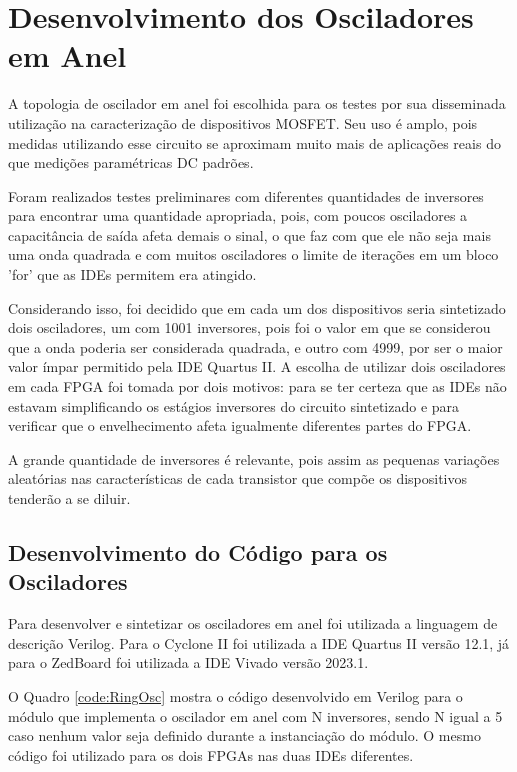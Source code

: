 \section{Desenvolvimento dos Osciladores em Anel}
\label{sec:MetOscilador}

A topologia de oscilador em anel foi escolhida para os testes por sua disseminada utilização na caracterização de dispositivos MOSFET. Seu uso é amplo, pois medidas utilizando esse circuito se aproximam muito mais de aplicações reais do que medições paramétricas DC padrões.

Foram realizados testes preliminares com diferentes quantidades de inversores para encontrar uma quantidade apropriada, pois, com poucos osciladores a capacitância de saída afeta demais o sinal, o que faz com que ele não seja mais uma onda quadrada e com muitos osciladores o limite de iterações em um bloco 'for' que as IDEs permitem era atingido.

Considerando isso, foi decidido que em cada um dos dispositivos seria sintetizado dois osciladores, um com 1001 inversores, pois foi o valor em que se considerou que a onda poderia ser considerada quadrada, e outro com 4999, por ser o maior valor ímpar permitido pela IDE Quartus II. A escolha de utilizar dois osciladores em cada FPGA foi tomada por dois motivos: para se ter certeza que as IDEs não estavam simplificando os estágios inversores do circuito sintetizado e para verificar que o envelhecimento afeta igualmente diferentes partes do FPGA.

A grande quantidade de inversores é relevante, pois assim as pequenas variações aleatórias nas características de cada transistor que compõe os dispositivos tenderão a se diluir.

\subsection{Desenvolvimento do Código para os Osciladores}

Para desenvolver e sintetizar os osciladores em anel foi utilizada a linguagem de descrição Verilog. Para o Cyclone II foi utilizada a IDE Quartus II versão 12.1, já para o ZedBoard foi utilizada a IDE Vivado versão 2023.1.

O Quadro \ref{code:RingOsc} mostra o código desenvolvido em Verilog para o módulo que implementa o oscilador em anel com N inversores, sendo N igual a 5 caso nenhum valor seja definido durante a instanciação do módulo. O mesmo código foi utilizado para os dois FPGAs nas duas IDEs diferentes.

